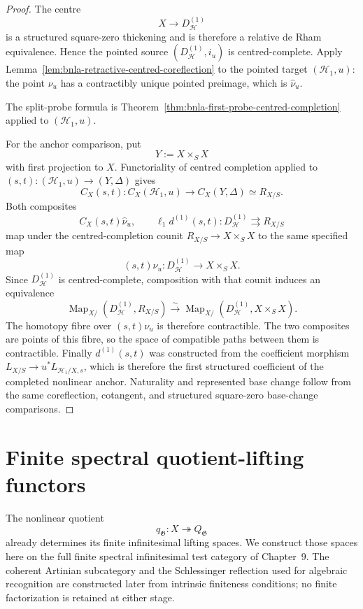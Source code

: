 \begin{proof}
The centre
\[
    X\longrightarrow D^{(1)}_{\mathcal H}
\]
is a structured square-zero thickening and is therefore a relative de Rham
equivalence.  Hence the pointed source
$(D^{(1)}_{\mathcal H},i_u)$ is centred-complete.  Apply
Lemma~\ref{lem:bnla-retractive-centred-coreflection} to the pointed target
$(\mathcal H_1,u)$: the point $\nu_u$ has a contractibly unique pointed
preimage, which is $\widehat\nu_u$.

The split-probe formula is
Theorem~\ref{thm:bnla-first-probe-centred-completion} applied to
$(\mathcal H_1,u)$.

For the anchor comparison, put
\[
    Y:=X\times_SX
\]
with first projection to $X$.  Functoriality of centred completion applied to
$(s,t):(\mathcal H_1,u)\to(Y,\Delta)$ gives
\[
    C_X(s,t):C_X(\mathcal H_1,u)\to C_X(Y,\Delta)\simeq R_{X/S}.
\]
Both composites
\[
    C_X(s,t)\widehat\nu_u,
    \qquad
    \ell_1d^{(1)}(s,t):
    D^{(1)}_{\mathcal H}\rightrightarrows R_{X/S}
\]
map under the centred-completion counit
$R_{X/S}\to X\times_SX$ to the same specified map
\[
    (s,t)\nu_u:
    D^{(1)}_{\mathcal H}\longrightarrow X\times_SX.
\]
Since $D^{(1)}_{\mathcal H}$ is centred-complete, composition with that counit
induces an equivalence
\[
    \operatorname{Map}_{X/}
    \left(D^{(1)}_{\mathcal H},R_{X/S}\right)
    \xrightarrow{\sim}
    \operatorname{Map}_{X/}
    \left(D^{(1)}_{\mathcal H},X\times_SX\right).
\]
The homotopy fibre over $(s,t)\nu_u$ is therefore contractible.  The two
composites are points of this fibre, so the space of compatible paths between
them is contractible.  Finally $d^{(1)}(s,t)$ was constructed from the
coefficient morphism
$L_{X/S}\to u^*L_{\mathcal H_1/X,s}$, which is therefore the first structured
coefficient of the completed nonlinear anchor.  Naturality and represented
base change follow from the same coreflection, cotangent, and structured
square-zero base-change comparisons.
\end{proof}

\section{Finite spectral quotient-lifting functors}
\label{sec:bnla-formal-moduli-envelope}

The nonlinear quotient
\[
    q_{\mathfrak G}:X\twoheadrightarrow Q_{\mathfrak G}
\]
already determines its finite infinitesimal lifting spaces.  We construct
those spaces here on the full finite spectral infinitesimal test category of
Chapter~9.  The coherent Artinian subcategory and the Schlessinger reflection
used for algebraic recognition are constructed later from intrinsic
finiteness conditions; no finite factorization is retained at either stage.

